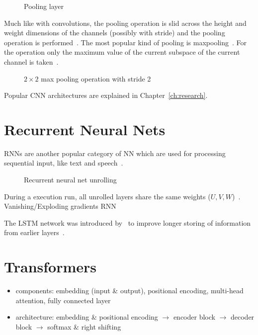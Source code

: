 \begin{figure}[h]
    \centering
    \caption{Pooling layer\label{fig:pool-layer}}
\end{figure}
Much like with convolutions, the pooling operation is slid across the height and weight dimensions
of the channels (possibly with stride) and the pooling operation is
performed~\citep{ponti_everything_2017,chauhan_review_2018}.
The most popular kind of pooling is maxpooling~\citep{ponti_everything_2017}.
For the operation only the maximum value of the current subspace of the current channel is
taken~\citep{chauhan_review_2018}.
\begin{figure}[ht]
    \centering
    \caption{$2\times 2$ max pooling operation with stride 2\label{fig:pool-layer}}
\end{figure}
Popular \ac{CNN} architectures are explained in Chapter~\ref{ch:research}.

\section{Recurrent Neural Nets}
\acp{RNN} are another popular category of \ac{NN} which are used for processing sequential input,
like text and speech~\citep{chauhan_review_2018}.
\begin{figure}[ht]
    \centering
    \caption{Recurrent neural net unrolling\label{fig:rnn-unrolling}}
\end{figure}
During a execution run, all unrolled layers share the same weights ($U,V,W$)~\citep{chauhan_review_2018}.
Vanishing/Exploding gradients
RNN

The \ac{LSTM} network was introduced by~\cite{hochreiter_long_1997} to improve longer storing of
information from earlier layers~\citep{chauhan_review_2018}.

\section{Transformers}
\begin{itemize}
    \item components: embedding (input \& output), positional encoding, multi-head attention,
        fully connected layer
    \item architecture: embedding \& positional encoding $\rightarrow$ encoder block
        $\rightarrow$ decoder block $\rightarrow$ softmax \& right shifting
\end{itemize}

